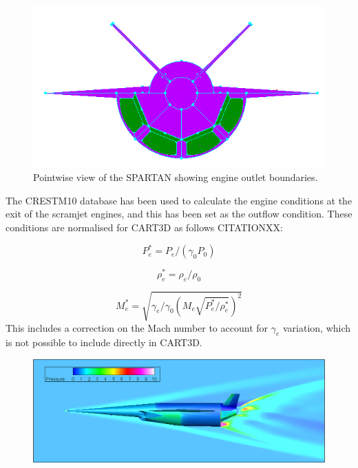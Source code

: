 		\begin{figure}
			\centering
			\includegraphics[width=0.7\linewidth]{figures/3_vehicle_design/Pointwise-EngineBC}
			\caption{Pointwise view of the SPARTAN showing engine outlet boundaries.}
			\label{fig:Pointwise-EngineBC}
		\end{figure}
		
		The CRESTM10 database has been used to calculate the engine conditions at the exit of the scramjet engines, and this has been set as the outflow condition. These conditions are normalised for CART3D as follows CITATIONXX:
		
		\begin{equation}
		P_e^* = P_e/(\gamma_0 P_0)
		\end{equation}
		
		\begin{equation}
		\rho_e^* = \rho_e/\rho_0
		\end{equation}
		
		\begin{equation}
		M_e^* = \sqrt{\gamma_e/\gamma_0 (M_e \sqrt{ P_e^*/\rho_e^*})^2}
		\end{equation}
		This includes a correction on the Mach number to account for $\gamma_e$ variation, which is not possible to include directly in CART3D\cite{Mehta2016}.
		
		\begin{figure}
			\centering
			\includegraphics[width=0.9\linewidth]{figures/3_vehicle_design/EngineOn-M7AoA024km}
			\caption{}
			\label{fig:EngineOn-M7AoA624km}
		\end{figure}
		
